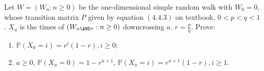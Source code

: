 \documentclass{ctexart}
\begin{document}
\begin{solution}
  
\end{solution}
\begin{problem}\label{pro:3}
  Let \(W=(W_n:n \geq 0)\) be the one-dimensional simple random walk with \(W_0=0\), whose transition matrix \(P\) given by equation \((4.4.3)\)
  on textbook, \(0< p<q<1\).
  \(X_a\) is the times of \((W_{n \AND \tau}:n \geq 0)\) downcrossing \(a\).
  \(r=\frac{p}{q}\).
  Prove:
  \begin{enumerate}
    \item \label{ite:3.1} \(\mathbb{P}(X_0=i)=r^i(1-r),i \geq 0\);
    \item \(a \geq 0\), \(\mathbb{P}(X_a=0)=1-r^{a +1}\), \(\mathbb{P}(X_a=i)=r^{a + 1}(1 -r),i \geq 1\).
  \end{enumerate}
\end{problem}
\end{document}
